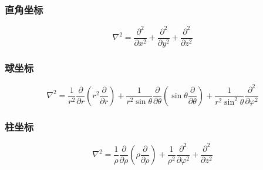 \subsubsection{直角坐标}

\begin{equation}
\nabla^2
=\frac{\partial^2 }{\partial x^2 } + \frac{\partial^2 }{\partial y^2 } + \frac{\partial^2 }{\partial z^2 }
\end{equation}

\subsubsection{球坐标}

\begin{equation}
\nabla^2
=\frac{1 }{r^2 } \frac{\partial }{\partial r } \left(r^2 \frac{\partial }{\partial r }  \right) + \frac{1 }{r^2 \sin\theta } \frac{\partial }{\partial \theta } \left(\sin\theta \frac{\partial }{\partial \theta }  \right) + \frac{1 }{r^2 \sin^2\theta } \frac{\partial^2 }{\partial \varphi^2 }
\end{equation}

\subsubsection{柱坐标}

\begin{equation}
\nabla^2
=\frac{1 }{\rho } \frac{\partial }{\partial \rho } \left(\rho \frac{\partial }{\partial \rho }  \right) + \frac{1 }{\rho^2 } \frac{\partial^2 }{\partial \varphi^2 } + \frac{\partial^2 }{\partial z^2 } 
\end{equation}



